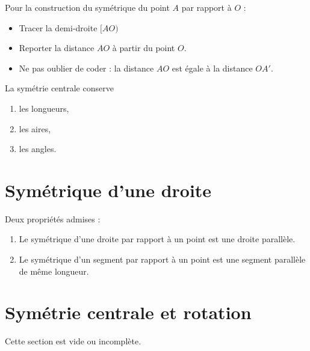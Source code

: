 Pour la construction du symétrique du point \( A\) par rapport à \( O\) :
\begin{itemize}
    \item Tracer la demi-droite \(  [AO) \)
    \item Reporter la distance \( AO\) à partir du point \( O\).
    \item Ne pas oublier de coder : la distance \( AO\) est égale à la distance \( OA'\).
\end{itemize}

\begin{center}
    
\end{center}

\begin{propriete}
    La symétrie centrale conserve
    \begin{enumerate}
        \item
            les longueurs,
        \item
            les aires,
        \item
            les angles.
    \end{enumerate}
\end{propriete}

\begin{center}
   
\end{center}

\section{Symétrique d'une droite}



Deux propriétés admises :
\begin{propriete}
    \begin{enumerate}
        \item
            Le symétrique d'une droite par rapport à un point est une droite parallèle.
        \item
            Le symétrique d'un segment par rapport à un point est une segment parallèle de même longueur.
    \end{enumerate}
\end{propriete}

\section{Symétrie centrale et rotation}

Cette section est vide ou incomplète.
